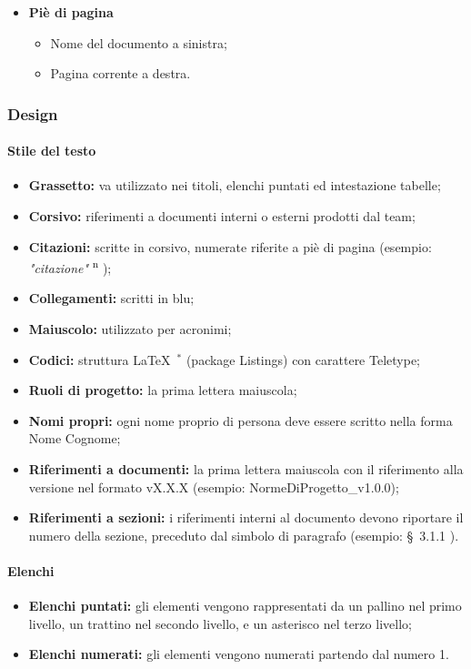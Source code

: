 \documentclass[11pt,a4paper]{article}
\begin{document}
{\begin{itemize}
		\item \textbf{Piè di pagina} 
		\begin{itemize}
			\item Nome del documento a sinistra;
			\item Pagina corrente a destra.
		\end{itemize}
	\end{itemize}
	
	\subsubsection{Design}
	
	\paragraph{Stile del testo}
	\begin{itemize}
		\item \textbf{Grassetto:} va utilizzato nei titoli, elenchi puntati ed intestazione tabelle;
		\item \textbf{Corsivo:} riferimenti a documenti interni o esterni prodotti dal team;
		\item \textbf{Citazioni:} scritte in corsivo, numerate riferite a piè di pagina (esempio: \textit{"citazione"} \textsuperscript{n} );
		\item \textbf{Collegamenti:} scritti in blu;
		\item \textbf{Maiuscolo:} utilizzato per acronimi;
		\item \textbf{Codici:} struttura \LaTeX\ $^*$ (package Listings) con carattere Teletype;
		\item \textbf{Ruoli di progetto:} la prima lettera maiuscola;
		\item \textbf{Nomi propri:} ogni nome proprio di persona deve essere scritto nella forma Nome Cognome;
		\item \textbf{Riferimenti a documenti:} la prima lettera maiuscola con il riferimento alla versione nel formato vX.X.X (esempio: NormeDiProgetto\_v1.0.0);
		\item \textbf{Riferimenti a sezioni:} i riferimenti interni al documento devono riportare il numero della sezione, preceduto dal simbolo di paragrafo (esempio: \S\ {3.1.1} ).
		
	\end{itemize}
	
	
	\paragraph{Elenchi}
	\begin{itemize}
		\item \textbf{Elenchi puntati:} gli elementi vengono rappresentati da un pallino nel primo livello, un trattino nel secondo livello, e un asterisco nel terzo livello; 
		\item \textbf{Elenchi numerati:} gli elementi vengono numerati partendo dal numero 1.
	\end{itemize}
	
}
\end{document}
